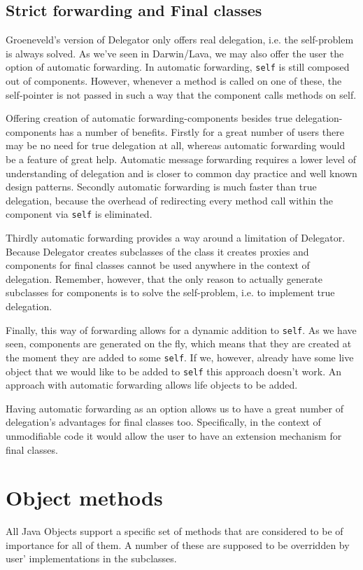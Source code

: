 \documentclass[a4paper,12pt]{book}
\begin{document}
\section*{Strict forwarding and Final classes}
Groeneveld's version of Delegator only offers real delegation, i.e. the self-problem is always solved. As we've seen in Darwin/Lava, we may also offer the user the option of automatic forwarding. In automatic forwarding, \verb|self| is still composed out of components. However, whenever a method is called on one of these, the self-pointer is not passed in such a way that the component calls methods on self.

Offering creation of automatic forwarding-components besides true delegation-components has a number of benefits. Firstly for a great number of users there may be no need for true delegation at all, whereas automatic forwarding would be a feature of great help. Automatic message forwarding requires a lower level of understanding of delegation and is closer to common day practice and well known design patterns. Secondly automatic forwarding is much faster than true delegation, because the overhead of redirecting every method call within the component via \verb|self| is eliminated.

Thirdly automatic forwarding provides a way around a limitation of Delegator. Because Delegator creates subclasses of the class it creates proxies and components for final classes cannot be used anywhere in the context of delegation. Remember, however, that the only reason to actually generate subclasses for components is to solve the self-problem, i.e. to implement true delegation.

Finally, this way of forwarding allows for a dynamic addition to \verb|self|. As we have seen, components are generated on the fly, which means that they are created at the moment they are added to some \verb|self|. If we, however, already have some live object that we would like to be added to \verb|self| this approach doesn't work. An approach with automatic forwarding allows life objects to be added.

Having automatic forwarding as an option allows us to have a great number of delegation's advantages for final classes too. Specifically, in the context of unmodifiable code it would allow the user to have an extension mechanism for final classes.




\chapter*{Object methods}
All Java Objects support a specific set of methods that are considered to be of importance for all of them. A number of these are supposed to be overridden by user' implementations in the subclasses. 
\end{document}
